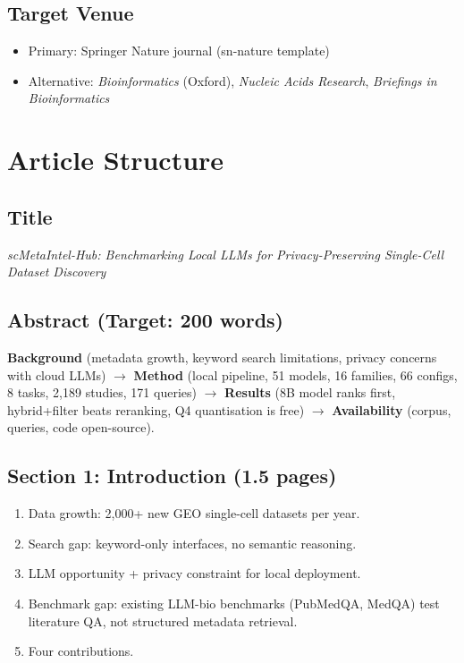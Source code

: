 \documentclass[11pt,a4paper]{article}
\begin{document}
\subsection{Target Venue}

\begin{itemize}
  \item Primary: Springer Nature journal (sn-nature template)
  \item Alternative: \textit{Bioinformatics} (Oxford),
        \textit{Nucleic Acids Research}, \textit{Briefings in Bioinformatics}
\end{itemize}

\section{Article Structure}

\subsection{Title}

\textit{scMetaIntel-Hub: Benchmarking Local LLMs for Privacy-Preserving
Single-Cell Dataset Discovery}

\subsection{Abstract (Target: 200 words)}

\textbf{Background} (metadata growth, keyword search limitations, privacy
concerns with cloud LLMs) $\to$ \textbf{Method} (local pipeline, 51 models,
16 families, 66 configs, 8 tasks, 2{,}189 studies, 171 queries) $\to$
\textbf{Results} (8B model ranks first, hybrid+filter beats reranking,
Q4 quantisation is free) $\to$ \textbf{Availability} (corpus, queries,
code open-source).

\subsection{Section 1: Introduction (1.5 pages)}

\begin{enumerate}[leftmargin=2em]
  \item Data growth: 2{,}000+ new GEO single-cell datasets per year.
  \item Search gap: keyword-only interfaces, no semantic reasoning.
  \item LLM opportunity + privacy constraint for local deployment.
  \item Benchmark gap: existing LLM-bio benchmarks (PubMedQA, MedQA) test
        literature QA, not structured metadata retrieval.
  \item Four contributions.
\end{enumerate}
\end{document}
